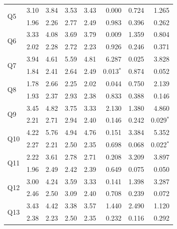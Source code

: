 \documentclass[10pt,twocolumn]{jsarticle}
\begin{document}
\begin{table}[htbp]
\begin{tabular*}{\textwidth}{@{\extracolsep{\fill}}lrrrrrrr}
        \multirow{2}{*}{Q5} & 3.10 & 3.84 & 3.53 & 3.43 & 0.000 & 0.724 & 1.265 \\
         & 1.96 & 2.26 & 2.77 & 2.49 & 0.983 & 0.396 & 0.262 \\ 
        
        \multirow{2}{*}{Q6} & 3.33 & 4.08 & 3.69 & 3.79 & 0.009 & 1.359 & 0.804 \\
         & 2.02 & 2.28 & 2.72 & 2.23 & 0.926 & 0.246 & 0.371 \\ 
        
        \multirow{2}{*}{Q7} & 3.94 & 4.61 & 5.59 & 4.81 & 6.287 & 0.025 & 3.828 \\
         & 1.84 & 2.41 & 2.64 & 2.49 & 0.013$^{*}$ & 0.874 & 0.052 \\ 
        
        \multirow{2}{*}{Q8} & 1.78 & 2.66 & 2.25 & 2.02 & 0.044 & 0.750 & 2.139 \\
         & 1.93 & 2.37 & 2.93 & 2.38 & 0.833 & 0.388 & 0.146 \\ 
        
        \multirow{2}{*}{Q9} & 3.45 & 4.82 & 3.75 & 3.33 & 2.130 & 1.380 & 4.860\\
         & 2.21 & 2.71 & 2.94 & 2.40 & 0.146 & 0.242 & 0.029$^{*}$ \\ 
        
        \multirow{2}{*}{Q10} & 4.22 & 5.76 & 4.94 & 4.76 & 0.151 & 3.384 & 5.352 \\
         & 2.27 & 2.21 & 2.50 & 2.35 & 0.698 & 0.068 & 0.022$^{*}$ \\ 
        
        \multirow{2}{*}{Q11} & 2.22 & 3.61 & 2.78 & 2.71 & 0.208 & 3.209 & 3.897 \\
         & 1.96 & 2.49 & 2.42 & 2.39 & 0.649 & 0.075 & 0.050 \\ 
        
        \multirow{2}{*}{Q12} & 3.00 & 4.24 & 3.59 & 3.33 & 0.141 & 1.398 & 3.287 \\
         & 2.46 & 2.50 & 3.09 & 2.40 & 0.708 & 0.239 & 0.072 \\ 
        
        \multirow{2}{*}{Q13} & 3.43 & 4.42 & 3.38 & 3.57 & 1.440 & 2.490 & 1.120 \\
         & 2.38 & 2.23 & 2.50 & 2.35 & 0.232 & 0.116 & 0.292 \\ 
        

\end{tabular*}
\end{table}
\end{document}
